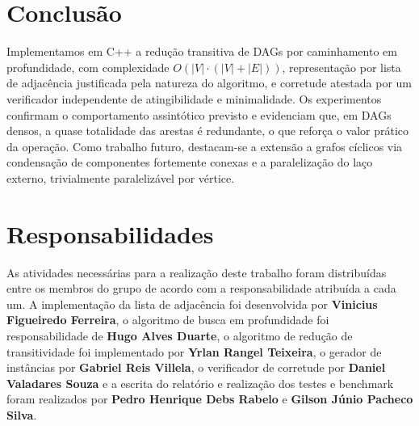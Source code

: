 \documentclass{sbc2023}%
\begin{document}
\section{Conclusão}
\label{sec:conclusao}

Implementamos em C++ a redução transitiva de DAGs por caminhamento em profundidade, com complexidade $O(|V|\cdot(|V|+|E|))$, representação por lista de adjacência justificada pela natureza do algoritmo, e corretude atestada por um verificador independente de atingibilidade e minimalidade. Os experimentos confirmam o comportamento assintótico previsto e evidenciam que, em DAGs densos, a quase totalidade das arestas é redundante, o que reforça o valor prático da operação. Como trabalho futuro, destacam-se a extensão a grafos cíclicos via condensação de componentes fortemente conexas e a paralelização do laço externo, trivialmente paralelizável por vértice.

\section{Responsabilidades}
\label{sec:resp}

As atividades necessárias para a realização deste trabalho foram distribuídas entre os membros do grupo de acordo com a responsabilidade atribuída a cada um. A implementação da lista de adjacência foi desenvolvida por \textbf{Vinicius Figueiredo Ferreira}, o algoritmo de busca em profundidade foi responsabilidade de \textbf{Hugo Alves Duarte}, o algoritmo de redução de transitividade foi implementado por \textbf{Yrlan Rangel Teixeira}, o gerador de instâncias por \textbf{Gabriel Reis Villela}, o verificador de corretude por \textbf{Daniel Valadares Souza} e a escrita do relatório e realização dos testes e benchmark foram realizados por \textbf{Pedro Henrique Debs Rabelo} e \textbf{Gilson Júnio Pacheco Silva}.



\end{document}
